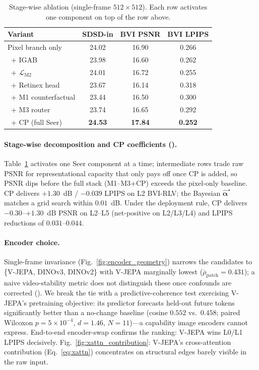 \begin{table}[b!]
\centering\scriptsize\setlength{\tabcolsep}{3pt}
\renewcommand{\arraystretch}{0.82}
\begin{tabular}{lccc}
\toprule
Variant & SDSD-in & BVI PSNR & BVI LPIPS \\
\midrule
Pixel branch only               & 24.02 & 16.90 & 0.266 \\
\ + IGAB                        & 23.98 & 16.60 & 0.262 \\
\ + $\mathcal{L}_{\text{M2}}$   & 24.01 & 16.72 & 0.255 \\
\ + Retinex head                & 23.67 & 16.14 & 0.318 \\
\ + M1 counterfactual           & 23.44 & 16.50 & 0.300 \\
\ + M3 router                   & 23.74 & 16.65 & 0.292 \\
\rowcolor{gray!8}
\ + CP (full Seer)              & \textbf{24.53} & \textbf{17.84} & \textbf{0.252} \\
\bottomrule
\end{tabular}
\caption{Stage-wise ablation (single-frame $512{\times}512$). Each row activates one component on top of the row above.}
\label{tab:ablation_stages}
\end{table}

\paragraph{Stage-wise decomposition and CP coefficients ().} Table~\ref{tab:ablation_stages} activates one Seer component at a time; intermediate rows trade raw PSNR for representational capacity that only pays off once CP is added, so PSNR dips before the full stack (M1--M3+CP) exceeds the pixel-only baseline. CP delivers $+1.30$~dB / $-0.039$ LPIPS on L2 BVI-RLV; the Bayesian $\widehat{\boldsymbol{\alpha}}^{\star}$ matches a grid search within $0.01$~dB. Under the deployment rule, CP delivers $-0.30$--$+1.30$~dB PSNR on L2--L5 (net-positive on L2/L3/L4) and LPIPS reductions of $0.031$--$0.044$.

\paragraph{Encoder choice.} Single-frame invariance (Fig.~\ref{fig:encoder_geometry}) narrows the candidates to \{V-JEPA, DINOv3, DINOv2\} with V-JEPA marginally lowest ($\overline{\rho}_{\text{patch}}\!=\!0.431$); a naive video-stability metric does not distinguish these once confounds are corrected (). We break the tie with a predictive-coherence test exercising V-JEPA's pretraining objective: its predictor forecasts held-out future tokens significantly better than a no-change baseline (cosine $0.552$ vs.\ $0.458$; paired Wilcoxon $p{=}5{\times}10^{-4}$, $d{=}1.46$, $N{=}11$)---a capability image encoders cannot express. End-to-end encoder-swap confirms the ranking: V-JEPA wins L0/L1 LPIPS decisively. Fig.~\ref{fig:xattn_contribution}: V-JEPA's cross-attention contribution (Eq.~\eqref{eq:xattn}) concentrates on structural edges barely visible in the raw input.

